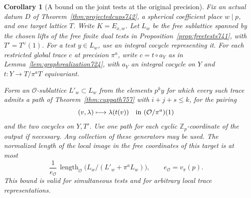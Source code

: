 \documentclass[a4paper,11pt]{article}
\newtheorem{corollary}[proposition]{Corollary}
\theoremstyle{definition}
\theoremstyle{remark}
\newcommand{\ZZ}{\mathbb Z}\newcommand{\ord}{\operatorname{ord}}
\numberwithin{equation}{section}
\begin{document}
\begin{corollary}[A bound on the joint tests at the original precision]
\leavevmode\label{cor:pathperiod757}
Fix an actual datum \(D\) of Theorem~\ref{thm:projectedcups742},
a spherical coefficient place \(w\mid p\), and one target lattice
\(T\). Write \(K=E_{x,w}\). Let \(L_w\) be the free sublattice
spanned by the chosen lifts of the free finite dual tests in
Proposition~\ref{prop:freetests741}, with \(T'=T^\vee(1)\).
For a test \(y\in L_w\), use an integral cocycle representing it.
For each restricted global trace \(c\) at precision \(\pi^a\),
write \(c=t\circ a_Y\) as in Lemma~\ref{lem:graphrealization724},
with \(a_Y\) an integral cocycle on \(Y\) and
\(t:Y\to T/\pi^aT\) equivariant.

Form an \(\mathcal O\)-sublattice \(L'_w\subset L_w\) from
the elements \(p^k y\) for which every such trace admits a
path of Theorem~\ref{thm:cuppath757} with \(i+j+s\le k\),
for the pairing
\[
          (v,\lambda)\longmapsto \lambda(t(v))
                              \quad\hbox{in }(\mathcal O/\pi^a)(1)
\]
and the two cocycles on \(Y,T'\). Use one path for each cyclic
\(\ZZ_p\)-coordinate of the output if necessary. Any collection
of these generators may be used. The normalized length of the
local image in the free coordinates of this target is at most
\[
          \frac{1}{e_{\mathcal O}}\,
              \operatorname{length}_{\mathcal O}
                        \big(L_w/(L'_w+\pi^a L_w)\big),
             \qquad e_{\mathcal O}=v_\pi(p).
\]
This bound is valid for simultaneous tests and for arbitrary
local trace representations.
\end{corollary}
\end{document}
